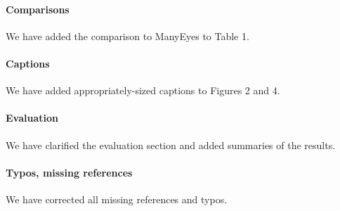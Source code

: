 \documentclass{article}
\begin{document}
\paragraph*{Comparisons} We have added the comparison to ManyEyes to Table 1.

\paragraph*{Captions} We have added appropriately-sized captions to Figures 2 and 4.

\paragraph*{Evaluation} We have clarified the evaluation section and added summaries of the results.

\paragraph*{Typos, missing references} We have corrected all missing references and typos.
\end{document}
